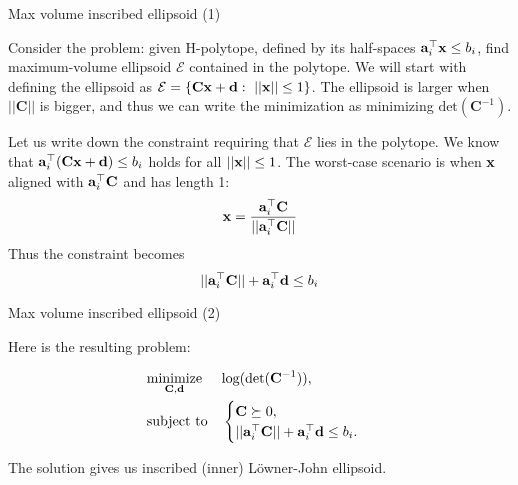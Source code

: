 \documentclass{beamer}
\begin{document}
\begin{frame}{Max volume inscribed ellipsoid (1)}
	\begin{flushleft}
		
		Consider the problem: given H-polytope, defined by its half-spaces $\mathbf{a}_i^\top \mathbf{x} \leq b_i$, find maximum-volume ellipsoid $\mathcal{E}$ contained in the polytope. We will start with defining the ellipsoid as $\mathcal{E} = \{ \mathbf{C}\mathbf{x} + \mathbf{d}: \ || \mathbf{x} || \leq 1 \}$. The ellipsoid is larger when $|| \mathbf{C} ||$ is bigger, and thus we can write the minimization as minimizing $\text{det} (\mathbf{C}^{-1}) $.
		
		\bigskip
		
		Let us write down the constraint requiring that $\mathcal{E}$ lies in the polytope. We know that $\mathbf{a}_i^\top (\mathbf{C}\mathbf{x} + \mathbf{d}) \leq b_i$ holds for all $|| \mathbf{x} || \leq 1$. The worst-case scenario is when $\mathbf{x}$ aligned with $\mathbf{a}_i^\top \mathbf{C}$ and has length 1:
		\begin{equation}
			\mathbf{x} = \frac{\mathbf{a}_i^\top \mathbf{C}}{|| \mathbf{a}_i^\top \mathbf{C} ||}
		\end{equation}
		Thus the constraint becomes
		\begin{equation}
			 || \mathbf{a}_i^\top \mathbf{C} || + \mathbf{a}_i^\top\mathbf{d} \leq b_i
		\end{equation}
		
	\end{flushleft}
\end{frame}



\begin{frame}{Max volume inscribed ellipsoid (2)}
	\begin{flushleft}
		
		Here is the resulting problem:
		
		\begin{equation}
			\begin{aligned}
				& \underset{\mathbf{C}, \mathbf{d}}{\text{minimize}}
				& & \text{log} (\text{det} (\mathbf{C}^{-1}) ), \\
				& \text{subject to}
				& & \begin{cases}
					\mathbf{C} \succeq 0, \\
					|| \mathbf{a}_i^\top \mathbf{C} || + \mathbf{a}_i^\top\mathbf{d} \leq b_i.
				\end{cases}
			\end{aligned}
		\end{equation}
		
		The solution gives us inscribed (inner) L\"owner-John ellipsoid.
		
	\end{flushleft}
\end{frame}
\end{document}

